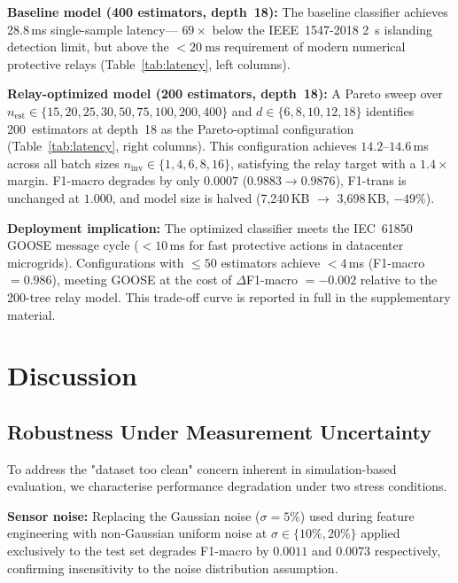 \documentclass[journal]{IEEEtran}
\begin{document}
\textbf{Baseline model (400 estimators, depth~18):}
The baseline classifier achieves 28.8\,ms single-sample latency---
$69\times$ below the IEEE~1547-2018 \SI{2}{\second} islanding detection
limit, but above the $<\SI{20}{\milli\second}$ requirement of modern
numerical protective relays (Table~\ref{tab:latency}, left columns).

\textbf{Relay-optimized model (200 estimators, depth~18):}
A Pareto sweep over $n_\text{est} \in \{15,20,25,30,50,75,100,200,400\}$
and $d \in \{6,8,10,12,18\}$ identifies 200~estimators at depth~18 as the
Pareto-optimal configuration (Table~\ref{tab:latency}, right columns).
This configuration achieves $14.2$--$14.6$\,ms across all batch sizes
$n_\text{inv} \in \{1,4,6,8,16\}$, satisfying the relay target with a
$1.4\times$ margin.
F1-macro degrades by only $0.0007$ ($0.9883 \rightarrow 0.9876$),
F1-trans is unchanged at $1.000$, and model size is halved
(7{,}240\,KB $\rightarrow$ 3{,}698\,KB, $-49\%$).

\textbf{Deployment implication:}
The optimized classifier meets the IEC~61850 GOOSE message cycle
($<10$\,ms for fast protective actions in datacenter microgrids).
Configurations with $\leq 50$ estimators achieve $<4$\,ms
(F1-macro $= 0.986$), meeting GOOSE at the cost of
$\Delta$F1-macro $= -0.002$ relative to the 200-tree relay model.
This trade-off curve is reported in full in the supplementary material.

\section{Discussion}
\label{sec:discussion}


\subsection{Robustness Under Measurement Uncertainty}
\label{sec:robustness}

To address the "dataset too clean" concern inherent in simulation-based
evaluation, we characterise performance degradation under two stress conditions.

\textbf{Sensor noise:}
Replacing the Gaussian noise ($\sigma = 5\%$) used during feature engineering
with non-Gaussian uniform noise at $\sigma \in \{10\%, 20\%\}$ applied
exclusively to the test set degrades F1-macro by $0.0011$ and $0.0073$ respectively,
confirming insensitivity to the noise distribution assumption.
\end{document}
